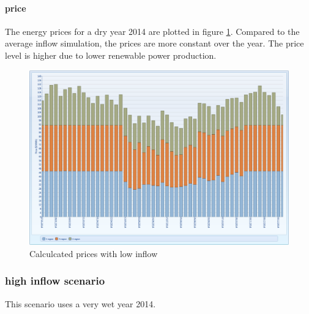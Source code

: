 \documentclass{article}
\begin{document}
\paragraph{price\\}
The energy prices for a dry year 2014 are plotted in figure \ref{fig:MTpriceslow}. Compared to the average inflow simulation, the prices are more constant over the year. The price level is higher due to lower renewable power production.
\begin{figure}[htbp]
\begin{center}
\includegraphics[width=13cm,keepaspectratio=true]{figures/drycase/MTpricesdry}
\caption{Calculcated prices with low inflow}
\label{fig:MTpriceslow}
\end{center}
\end{figure}

\subsubsection{high inflow scenario}
This scenario uses a very wet year 2014. 
\end{document}
